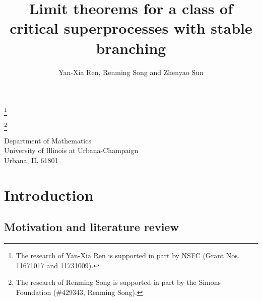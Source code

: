 \documentclass[12pt, a4paper]{amsart}
\theoremstyle{definition}
\numberwithin{equation}{section}
\begin{document}
\title
	[Manuscript]
	{\large Limit theorems for a class of critical superprocesses with stable branching}
\author{Yan-Xia Ren, Renming Song and Zhenyao Sun}
\address
	{Yan-Xia Ren\\
	School of Mathematical Sciences\\
	Peking University\\
	Beijing, P. R. China, 100871}
\thanks{The research of Yan-Xia Ren is supported in part by NSFC (Grant Nos. 11671017  and 11731009).}
\address
	{Renming Song\\
	Dept of Mathematics\\
	University of Illinois at Urbana-Champaign\\
	Urbana, IL 61801}
\thanks{The research of Renming Song is supported in part by the Simons Foundation (\#429343, Renming Song).}
\address
	{Zhenyao Sun\\
	School of Mathematical Sciences\\
	Peking University\\
	Beijing, P. R. China, 100871}
\curraddr
	{Department of Mathematics\\
	University of Illinois at Urbana-Champaign\\
	Urbana, IL 61801}
\begin{abstract}
\end{abstract}
\maketitle
\section{Introduction}

\subsection{Motivation and literature review}
\end{document}
